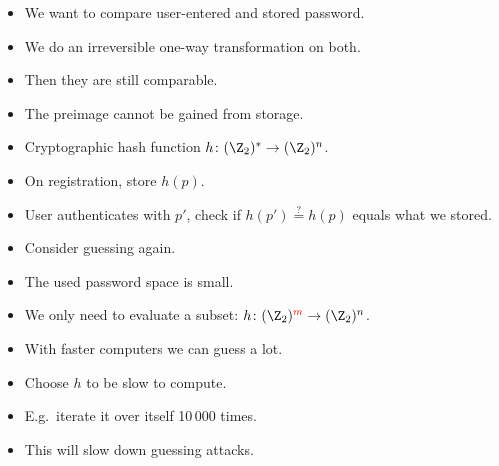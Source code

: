 \begin{frame}
  \begin{solution}[Passwords]
    \begin{itemize}
      \item We want to compare user-entered and stored password.
      \item We do an irreversible one-way transformation on both.
      \item Then they are still comparable.
      \item The preimage cannot be gained from storage.
    \end{itemize}
  \end{solution}

  \pause{}

  \begin{example}
    \begin{itemize}
      \item Cryptographic hash function \(h\colon (\Z_2)^*\to (\Z_2)^n\).
      \item On registration, store \(h(p)\).
      \item User authenticates with \(p'\), check if \(h(p') \stackrel{?}{=}  
          h(p)\) equals what we stored.
    \end{itemize}
  \end{example}
\end{frame}

\begin{frame}
  \begin{remark}
    \begin{itemize}
      \item Consider guessing again.
      \item The used password space is small.
      \item We only need to evaluate a subset: \(h\colon 
          (\Z_2)^{\color{red}{m}}\to (\Z_2)^n\).
      \item With faster computers we can guess a lot.
    \end{itemize}
  \end{remark}

  \pause{}

  \begin{solution}
    \begin{itemize}
      \item Choose \(h\) to be slow to compute.
      \item E.g.\ iterate it over itself 10\,000 times.
      \item This will slow down guessing attacks.
    \end{itemize}
  \end{solution}
\end{frame}

